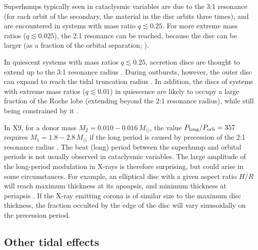 \documentclass[a4paper,fleqn,usenatbib]{mnras}
\begin{document}
Superhumps typically seen in cataclysmic variables are due to the 3:1 resonance (for each orbit of the secondary, the material in the disc orbits three times), and are encountered in systems with mass ratio $q \lesssim 0.25$. For more extreme mass ratios ($q \lesssim 0.025$), the 2:1 resonance can be reached, because the disc can be larger (as a fraction of the orbital separation; \citealp{1991MNRAS.249...25W}).

In quiescent systems with mass ratios $q \lesssim 0.25$, accretion discs are thought to extend up to the 3:1 resonance radius \citep{1990PASJ...42..135H}. During outbursts, however, the outer disc can expand to reach the tidal truncation radius \citep{1977ApJ...216..822P, 1977MNRAS.181..441P, 1988MNRAS.232...35W}. In addition, the discs of systems with extreme mass ratios ($q \lesssim 0.01$) in quiescence are likely to occupy a large fraction of the Roche lobe (extending beyond the 2:1 resonance radius), while still being constrained by it \citep{1988ApJ...333..895P, 2012A&A...537A.104V}.

In X9, for a donor mass $M_2 = 0.010 - 0.016\,M_\odot$, the value $P_{\rm long}/P_{\rm orb} = 357$ requires $M_1 = 1.8 - 2.8\,M_\odot$ if the long period is caused by precession of the 2:1 resonance radius \citep{2003MNRAS.346L..21P}. The beat (long) period between the superhump and orbital periods is not usually observed in cataclysmic variables. The large amplitude of the long-period modulation in X-rays is therefore surprising, but could arise in some circumstances. For example, an elliptical disc with a given aspect ratio $H/R$ will reach maximum thickness at its apoapsis, and minimum thickness at periapsis \citep{1982ApJ...257..318W, 1985A&A...144..369O}. If the X-ray emitting corona is of similar size to the maximum disc thickness, the fraction occulted by the edge of the disc will vary sinusoidally on the precession period.

\subsection{Other tidal effects}
\end{document}

